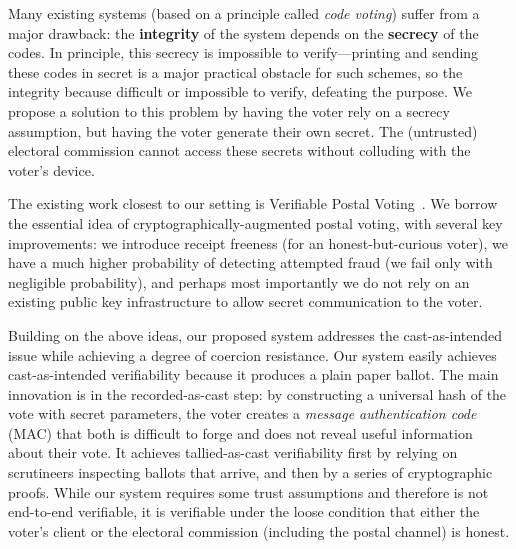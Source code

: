 \documentclass[12pt,a4paper]{article}
\theoremstyle{definition}
\begin{document}
Many existing systems (based on a principle called \textit{code voting}) suffer from a major drawback: the \textbf{integrity} of the system depends on the \textbf{secrecy} of the codes. In principle, this secrecy is impossible to verify---printing and sending these codes in secret is a major practical obstacle for such schemes, so the integrity because  difficult or impossible to verify, defeating the purpose. We propose a solution to this problem by having the voter rely on a secrecy assumption, but having the voter generate their own secret. The (untrusted) electoral commission cannot access these secrets without colluding with the voter's device.

The existing work closest to our setting is Verifiable Postal Voting~\cite{benaloh2013verifiable}. We borrow the essential idea of cryptographically-augmented postal voting, with several key improvements: we introduce receipt freeness (for an honest-but-curious voter), we have a much higher probability of detecting attempted fraud (we fail only with negligible probability), and perhaps most importantly we do not rely on an existing public key infrastructure to allow secret communication to the voter.

Building on the above ideas, our proposed system addresses the cast-as-intended issue while achieving a degree of coercion resistance. Our system easily achieves cast-as-intended verifiability because it produces a plain paper ballot. The main innovation is in the recorded-as-cast step: by constructing a universal hash of the vote with secret parameters, the voter creates a \textit{message authentication code} (MAC) that both is difficult to forge and does not reveal useful information about their vote. It achieves tallied-as-cast verifiability first by relying on scrutineers inspecting ballots that arrive, and then by a series of cryptographic proofs. While our system requires some trust assumptions and therefore is not end-to-end verifiable, it is verifiable under the loose condition that either the voter's client or the electoral commission (including the postal channel) is honest.
\end{document}
